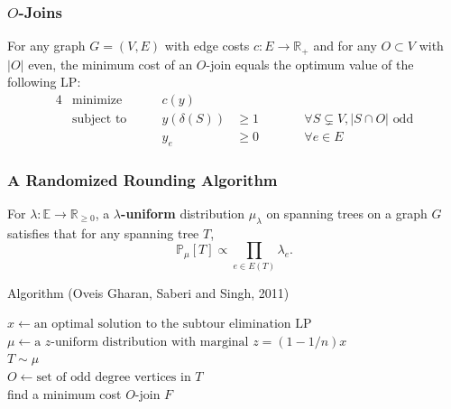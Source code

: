 \documentclass{beamer}
\newcommand{\RR}{\mathbb{R}}
\newcommand{\EE}{\mathbb{E}}
\newcommand{\PP}{\mathbb{P}}
\begin{document}
  \begin{frame}
    \frametitle{$O$-Joins}
  
    \begin{theorem}
      For any graph $G = (V, E)$ with edge costs $c : E \to \RR_+$ and for any $O \subset V$ with $|O|$ even, the minimum cost of an $O$-join equals the optimum value of the following LP:
      \begin{alignat*}{4}
        & \text{minimize} \qquad & c(y) \\
        & \text{subject to} \qquad & y(\delta(S)) &\geq 1 && \qquad \forall S \subsetneq V, |S \cap O| \text{ odd} \\
        & & y_e &\geq 0 && \qquad \forall e \in E
      \end{alignat*}
    \end{theorem}
  
  \end{frame}

  \begin{frame}
    \frametitle{A Randomized Rounding Algorithm}

    \begin{definition}
      For $\lambda: \EE \to \RR_{\geq 0}$, a {\bf $\lambda$-uniform} distribution $\mu_\lambda$ on spanning trees on a graph $G$ satisfies that for any spanning tree $T$,
      $$ \PP_\mu[T] \propto \prod_{e \in E(T)} \lambda_e. $$
    \end{definition}
  
    \begin{block}{Algorithm (Oveis Gharan, Saberi and Singh, 2011)}
      \begin{algorithm}[H]
        $x \leftarrow \text{an optimal solution to the subtour elimination LP}$ \\
        $\mu \leftarrow \text{a $z$-uniform distribution with marginal $z = (1 - 1/n) x$}$ \\
        $T \sim \mu$ \\
        $O \leftarrow \text{set of odd degree vertices in $T$}$ \\
        find a minimum cost $O$-join $F$ \\
      \end{algorithm}
    \end{block}
  
  \end{frame}
\end{document}
